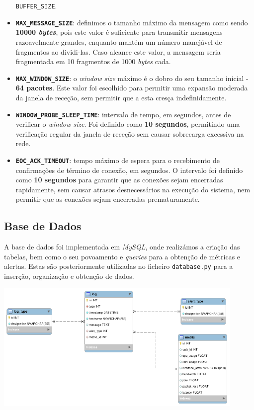 \documentclass[a4paper,12pt]{scrreprt}
\begin{document}
\begin{itemize}
    \texttt{BUFFER\_SIZE}.
    \item \textbf{\texttt{MAX\_MESSAGE\_SIZE}}: definimos o tamanho máximo da mensagem como sendo \textbf{10000 \textit{bytes}},
    pois este valor é suficiente para transmitir mensagens razoavelmente grandes, enquanto mantém um número manejável de fragmentos ao dividi-las.
    Caso alcance este valor, a mensagem seria fragmentada em 10 fragmentos de 1000 \textit{bytes} cada.
    \item \textbf{\texttt{MAX\_WINDOW\_SIZE}}: o \textit{window size} máximo é o dobro do seu tamanho inicial - \textbf{64 pacotes}.
    Este valor foi escolhido para permitir uma expansão moderada da janela de receção, sem permitir que a esta cresça indefinidamente.
    \item \textbf{\texttt{WINDOW\_PROBE\_SLEEP\_TIME}}: intervalo de tempo, em segundos, antes de verificar o \textit{window size}.
    Foi definido como \textbf{10 segundos}, permitindo uma verificação regular da janela de receção sem causar sobrecarga excessiva na rede.
    \item \textbf{\texttt{EOC\_ACK\_TIMEOUT}}: tempo máximo de espera para o recebimento de confirmações de término de conexão, em segundos.
    O intervalo foi definido como \textbf{10 segundos} para garantir que as conexões sejam encerradas rapidamente, sem causar atrasos
    desnecessários na execução do sistema, nem permitir que as conexões sejam encerradas prematuramente.
\end{itemize}

\subsection{Base de Dados}

A base de dados foi implementada em \textit{MySQL}, onde realizámos a criação das tabelas, bem como o seu
povoamento e \textit{queries} para a obtenção de métricas e alertas. Estas são posteriormente utilizadas no
ficheiro \texttt{database.py} para a inserção, organização e obtenção de dados.

\begin{minipage}{\textwidth}
    \centering
    \includegraphics[width=0.9\textwidth]{img/db.png}
    \label{fig:database}
\end{minipage}
\end{document}

